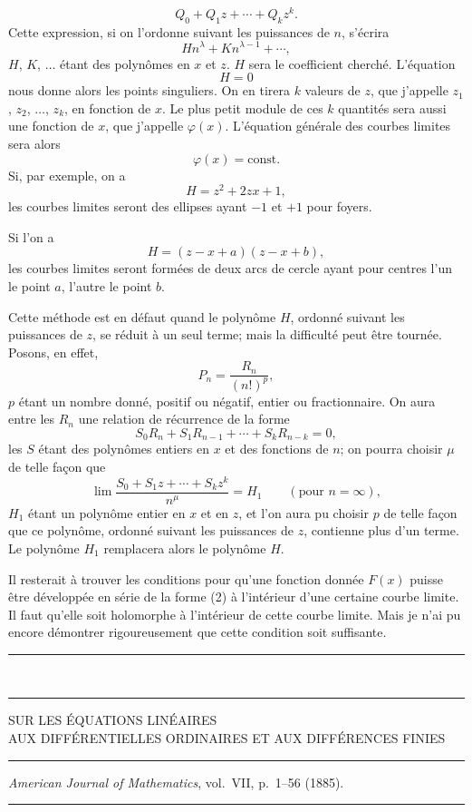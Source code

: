 \documentclass[11pt]{article}
\newcommand{\ornament}{\begin{center}\rule{2.5em}{0.4pt}\,\raisebox{0.1ex}{\tiny$\bullet\bullet\bullet$}\,\rule{2.5em}{0.4pt}\end{center}}
\newcommand{\shortline}{\begin{center}\rule{3.5em}{0.4pt}\end{center}}
\begin{document}
\[
Q_0+Q_1z+\cdots+Q_kz^k.
\]
Cette expression, si on l'ordonne suivant les puissances de $n$, s'écrira
\[
Hn^\lambda+Kn^{\lambda-1}+\cdots,
\]
$H$, $K$, $\ldots$ étant des polynômes en $x$ et $z$. $H$ sera le coefficient cherché. L'équation
\[
H=0
\]
nous donne alors les points singuliers. On en tirera $k$ valeurs de $z$, que j'appelle $z_1$, $z_2$, $\ldots$, $z_k$, en fonction de $x$. Le plus petit module de ces $k$ quantités sera aussi une fonction de $x$, que j'appelle $\varphi(x)$. L'équation générale des courbes limites sera alors
\[
\varphi(x)=\text{const.}
\]
Si, par exemple, on a
\[
H=z^2+2zx+1,
\]
les courbes limites seront des ellipses ayant $-1$ et $+1$ pour foyers.

Si l'on a
\[
H=(z-x+a)(z-x+b),
\]
les courbes limites seront formées de deux arcs de cercle ayant pour centres l'un le point $a$, l'autre le point $b$.

Cette méthode est en défaut quand le polynôme $H$, ordonné suivant les puissances de $z$, se réduit à un seul terme; mais la difficulté peut être tournée. Posons, en effet,
\[
P_n=\frac{R_n}{(n!)^p},
\]
$p$ étant un nombre donné, positif ou négatif, entier ou fractionnaire. On aura entre les $R_n$ une relation de récurrence de la forme
\[
S_0R_n+S_1R_{n-1}+\cdots+S_kR_{n-k}=0,
\]
les $S$ étant des polynômes entiers en $x$ et des fonctions de $n$; on pourra choisir $\mu$ de telle façon que
\[
\lim \frac{S_0+S_1z+\cdots+S_kz^k}{n^\mu}=H_1 \qquad (\text{pour } n=\infty),
\]
$H_1$ étant un polynôme entier en $x$ et en $z$, et l'on aura pu choisir $p$ de telle façon que ce polynôme, ordonné suivant les puissances de $z$, contienne plus d'un terme. Le polynôme $H_1$ remplacera alors le polynôme $H$.

Il resterait à trouver les conditions pour qu'une fonction donnée $F(x)$ puisse être développée en série de la forme (2) à l'intérieur d'une certaine courbe limite. Il faut qu'elle soit holomorphe à l'intérieur de cette courbe limite. Mais je n'ai pu encore démontrer rigoureusement que cette condition soit suffisante.

\ornament

\begin{center}
{\Large SUR LES ÉQUATIONS LINÉAIRES}\\[0.45em]
{\large AUX DIFFÉRENTIELLES ORDINAIRES ET AUX DIFFÉRENCES FINIES}
\end{center}
\shortline
\begin{center}
\emph{American Journal of Mathematics}, vol.~VII, p.~1--56 (1885).
\end{center}
\shortline
\end{document}
